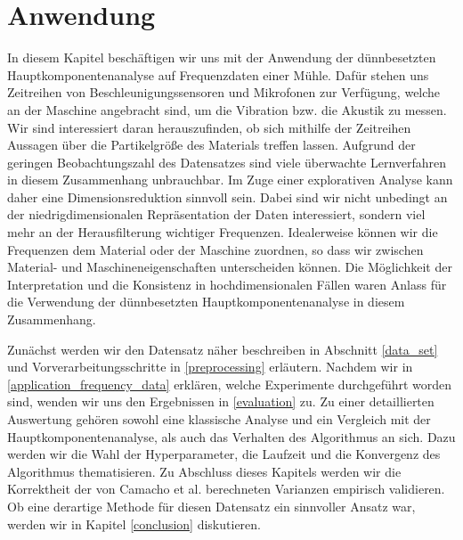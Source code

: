 \chapter{Anwendung}

\label{application}

In diesem Kapitel beschäftigen wir uns mit der Anwendung der dünnbesetzten Hauptkomponentenanalyse auf Frequenzdaten einer Mühle. Dafür stehen uns Zeitreihen von Beschleunigungssensoren und Mikrofonen zur Verfügung, welche an der Maschine angebracht sind, um die Vibration bzw. die Akustik zu messen. Wir sind interessiert daran herauszufinden, ob sich mithilfe der Zeitreihen Aussagen über die Partikelgröße des Materials treffen lassen. Aufgrund der geringen Beobachtungszahl des Datensatzes sind viele überwachte Lernverfahren in diesem Zusammenhang unbrauchbar. Im Zuge einer explorativen Analyse kann daher eine Dimensionsreduktion sinnvoll sein. Dabei sind wir nicht unbedingt an der niedrigdimensionalen Repräsentation der Daten interessiert, sondern viel mehr an der Herausfilterung wichtiger Frequenzen. Idealerweise können wir die Frequenzen dem Material oder der Maschine zuordnen, so dass wir zwischen Material- und Maschineneigenschaften unterscheiden können. Die Möglichkeit der Interpretation und die Konsistenz in hochdimensionalen Fällen waren Anlass für die Verwendung der dünnbesetzten Hauptkomponentenanalyse in diesem Zusammenhang. 

Zunächst werden wir den Datensatz näher beschreiben in Abschnitt \ref{data_set} und Vorverarbeitungsschritte in \ref{preprocessing} erläutern. Nachdem wir in \ref{application_frequency_data} erklären, welche Experimente durchgeführt worden sind, wenden wir uns den Ergebnissen in \ref{evaluation} zu. Zu einer detaillierten Auswertung gehören sowohl eine klassische Analyse und ein Vergleich mit der Hauptkomponentenanalyse, als auch das Verhalten des Algorithmus an sich. Dazu werden wir die Wahl der Hyperparameter, die Laufzeit und die Konvergenz des Algorithmus thematisieren. Zu Abschluss dieses Kapitels werden wir die Korrektheit der von Camacho et al. \cite{camacho} berechneten Varianzen empirisch validieren. Ob eine derartige Methode für diesen Datensatz ein sinnvoller Ansatz war, werden wir in Kapitel \ref{conclusion} diskutieren.




